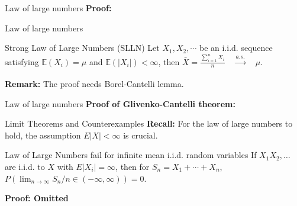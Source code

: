 \documentclass [aspectratio=169]{beamer}
\begin{document}
\begin{frame}{Law of large numbers}
\textbf{Proof:}\\
\vspace{1.5in}
\end{frame}


\begin{frame}{Law of large numbers}
    \begin{block}{Strong Law of Large Numbers (SLLN)}
    Let $X_1, X_2, \cdots$ be an i.i.d. sequence satisfying $\mathbb{E}(X_i) = \mu$ and $\mathbb{E}(|X_i|) < \infty$, then 
    $\bar{X} = \frac{\sum_{i = 1}^n X_i}{n} \quad \xrightarrow[]{a.s.} \quad \mu $.
    \end{block}
    \vspace{0.1in}
    \textbf{Remark:} The proof needs Borel-Cantelli lemma.
    \vspace{0.1in}
\end{frame}

\begin{frame}{Law of large numbers}
    \textbf{Proof of Glivenko-Cantelli theorem:}\\
    \vspace{2.5in}
\end{frame}

\begin{frame}{Limit Theorems and Counterexamples}
    \textbf{Recall:} For the law of large numbers to hold, the assumption $E|X|<\infty$ is crucial. \\ 
    \begin{block}{Law of Large Numbers fail for infinite mean i.i.d. random variables}
    If $X_1 X_2, \dots$ are i.i.d. to $X$ with $E|X_i| = \infty$, then for $S_n = X_1 + \cdots + X_n$, $P(\lim_{n\to \infty}S_n/n \in (-\infty, \infty))=0$.
    \end{block}
    \textbf{Proof: Omitted}
    \vspace{1.8in}
\end{frame}
\end{document}
